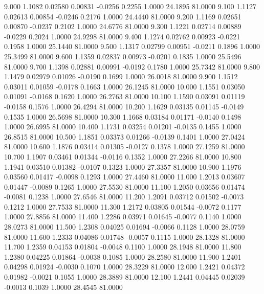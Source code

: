    9.000   1.1082   0.02580   0.00831  -0.0256   0.2255   1.0000  24.1895  81.0000
   9.100   1.1127   0.02613   0.00854  -0.0246   0.2176   1.0000  24.4440  81.0000
   9.200   1.1169   0.02651   0.00870  -0.0237   0.2102   1.0000  24.6776  81.0000
   9.300   1.1221   0.02714   0.00889  -0.0229   0.2024   1.0000  24.9298  81.0000
   9.400   1.1274   0.02762   0.00923  -0.0221   0.1958   1.0000  25.1440  81.0000
   9.500   1.1317   0.02799   0.00951  -0.0211   0.1896   1.0000  25.3499  81.0000
   9.600   1.1359   0.02837   0.00973  -0.0201   0.1835   1.0000  25.5496  81.0000
   9.700   1.1398   0.02881   0.00991  -0.0192   0.1780   1.0000  25.7342  81.0000
   9.800   1.1479   0.02979   0.01026  -0.0190   0.1699   1.0000  26.0018  81.0000
   9.900   1.1512   0.03011   0.01059  -0.0178   0.1663   1.0000  26.1245  81.0000
  10.000   1.1551   0.03050   0.01091  -0.0168   0.1620   1.0000  26.2763  81.0000
  10.100   1.1590   0.03091   0.01119  -0.0158   0.1576   1.0000  26.4294  81.0000
  10.200   1.1629   0.03135   0.01145  -0.0149   0.1535   1.0000  26.5698  81.0000
  10.300   1.1668   0.03184   0.01171  -0.0140   0.1498   1.0000  26.6995  81.0000
  10.400   1.1731   0.03254   0.01201  -0.0135   0.1455   1.0000  26.8515  81.0000
  10.500   1.1851   0.03373   0.01266  -0.0139   0.1401   1.0000  27.0424  81.0000
  10.600   1.1876   0.03414   0.01305  -0.0127   0.1378   1.0000  27.1259  81.0000
  10.700   1.1907   0.03461   0.01344  -0.0116   0.1352   1.0000  27.2266  81.0000
  10.800   1.1941   0.03510   0.01382  -0.0107   0.1323   1.0000  27.3357  81.0000
  10.900   1.1976   0.03560   0.01417  -0.0098   0.1293   1.0000  27.4460  81.0000
  11.000   1.2013   0.03607   0.01447  -0.0089   0.1265   1.0000  27.5530  81.0000
  11.100   1.2050   0.03656   0.01474  -0.0081   0.1238   1.0000  27.6546  81.0000
  11.200   1.2091   0.03712   0.01502  -0.0073   0.1212   1.0000  27.7533  81.0000
  11.300   1.2172   0.03805   0.01544  -0.0072   0.1177   1.0000  27.8856  81.0000
  11.400   1.2286   0.03971   0.01645  -0.0077   0.1140   1.0000  28.0273  81.0000
  11.500   1.2308   0.04025   0.01694  -0.0066   0.1128   1.0000  28.0759  81.0000
  11.600   1.2333   0.04086   0.01748  -0.0057   0.1115   1.0000  28.1328  81.0000
  11.700   1.2359   0.04153   0.01804  -0.0048   0.1100   1.0000  28.1948  81.0000
  11.800   1.2380   0.04225   0.01864  -0.0038   0.1085   1.0000  28.2580  81.0000
  11.900   1.2401   0.04298   0.01924  -0.0030   0.1070   1.0000  28.3229  81.0000
  12.000   1.2421   0.04372   0.01982  -0.0021   0.1055   1.0000  28.3889  81.0000
  12.100   1.2441   0.04445   0.02039  -0.0013   0.1039   1.0000  28.4545  81.0000
